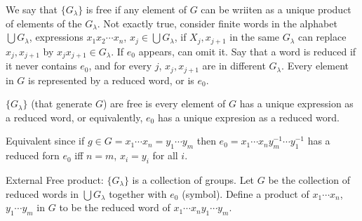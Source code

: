 \noindent
We say that $\{G_{\lambda}\}$ is free if any element of $G$ can be wriiten as a unique product of elements of the $G_{\lambda}$. Not exactly true, consider finite words in the alphabet $\bigcup G_{\lambda}$, expressions $x_1x_2 \cdots x_n$, $x_j \in \bigcup G_{\lambda}$, if $X_j, x_{j+1}$ in the same $G_{\lambda}$ can replace $x_j, x_{j+1}$ by $x_jx_{j+1} \in G_{\lambda}$. If $e_0$ appears, can omit it. Say that a word is reduced if it never contains $e_0$, and for every $j$, $x_j, x_{j+1}$ are in different $G_{\lambda}$. Every element in $G$ is represented by a reduced word, or is $e_0$. 

\begin{definition}
    $\{G_{\lambda}\}$ (that generate $G$) are free is every element of $G$ has a unique expression as a reduced word, or equivalently, $e_0$ has a unique expresion as a reduced word. 
\end{definition}

\noindent
Equivalent since if $g \in G = x_1 \cdots x_n = y_1 \cdots y_m$ then $e_0 = x_1 \cdots x_n y_{m}^{-1} \cdots y_1^{-1}$ has a reduced forn $e_0$ iff $n=m$, $x_i = y_i$ for all $i$. 

\noindent
External Free product: $\{G_{\lambda}\}$ is a collection of groups. Let $G$ be the collection of reduced words in $\bigcup G_{\lambda}$ together with $e_0$ (symbol). Define a product of $x_1 \cdots x_n$, $y_1 \cdots y_m$ in $G$ to be the reduced word of $x_1 \cdots x_n y_1 \cdots y_m$. 